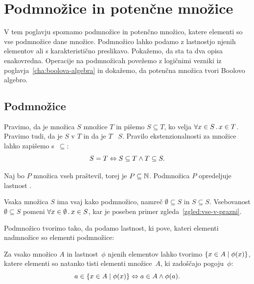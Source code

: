 \chapter{Podmnožice in potenčne množice}
\label{cha:podmnozice}

V tem poglavju spoznamo podmnožice in potenčno množico, katere elementi so vse podmnožice dane množice.
%
Podmnožico lahko podamo z lastnostjo njenih elementov ali s karakteristično preslikavo.
%
Pokažemo, da sta ta dva opisa enakovredna.
%
Operacije na podmnožicah povežemo z logičnimi vezniki iz poglavja~\ref{cha:boolova-algebra} in dokažemo, da potenčna množica tvori Boolovo algebro.

\section{Podmnožice}
\label{sec:podmnozice}

Pravimo, da je množica $S$  množice $T$ in pišemo $S \subseteq T$, ko velja $\forall x \in S \,.\, x \in T$. Pravimo tudi, da je $S$  v $T$ in da je $T$ ~$S$.
%
Pravilo ekstenzionalnosti za množice lahko zapišemo s~$\subseteq$:
%
\begin{equation*}
  S = T \Leftrightarrow S \subseteq T \land T \subseteq S.
\end{equation*}

\begin{zgled}
  Naj bo $P$ množica vseh praštevil, torej je $P \subseteq \mathbb{N}$. Podmnožica $P$
  opredeljuje lastnost .
\end{zgled}

\begin{zgled}
  Vsaka množica $S$ ima vsaj kako podmnožico, namreč $\emptyset \subseteq S$ in $S \subseteq S$.
  Vsebovanost $\emptyset \subseteq S$ pomeni $\forall x \in \emptyset \,.\, x \in S$, kar je poseben primer zgleda~\ref{zgled:vse-v-prazni}.
\end{zgled}

Podmnožico tvorimo tako, da podamo lastnost, ki pove, kateri elementi nadmnožice so elementi podmnožice:

\begin{pravilo}[Podmnožica]
  \label{pravilo:podmnozica}
  Za vsako množico $A$ in lastnost~$\phi$ njenih elementov lahko tvorimo
    $\left\{x \in A \; \middle| \; \phi(x)\right\}$, katere elementi so
  natanko tisti elementi množice~$A$, ki zadoščajo pogoju~$\phi$:
  \begin{equation*}
    a \in \left\{x \in A \; \middle| \; \phi(x)\right\} \Leftrightarrow a \in A \land \phi(a).
  \end{equation*}
\end{pravilo}

